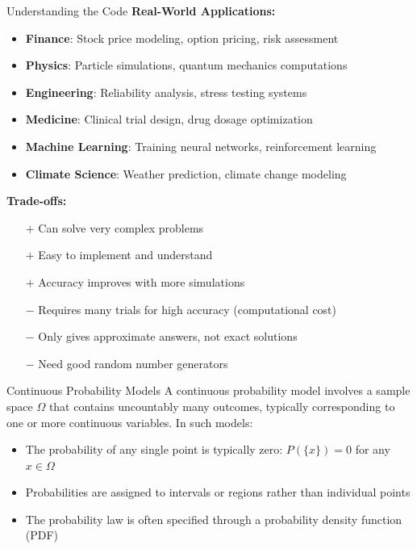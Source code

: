 \begin{itemize}
\begin{keyconceptboxbreak}{Understanding the Code}
\textbf{Real-World Applications:}

\begin{itemize}
    \item \textbf{Finance}: Stock price modeling, option pricing, risk assessment
    \item \textbf{Physics}: Particle simulations, quantum mechanics computations
    \item \textbf{Engineering}: Reliability analysis, stress testing systems
    \item \textbf{Medicine}: Clinical trial design, drug dosage optimization
    \item \textbf{Machine Learning}: Training neural networks, reinforcement learning
    \item \textbf{Climate Science}: Weather prediction, climate change modeling
\end{itemize}

\textbf{Trade-offs:}

\begin{itemize}
    \item[$+$] Can solve very complex problems
    \item[$+$] Easy to implement and understand
    \item[$+$] Accuracy improves with more simulations
    \item[$-$] Requires many trials for high accuracy (computational cost)
    \item[$-$] Only gives approximate answers, not exact solutions
    \item[$-$] Need good random number generators
\end{itemize}

\end{keyconceptboxbreak}

\begin{definitionboxbreak}{Continuous Probability Models}
A continuous probability model involves a sample space $\Omega$ that contains uncountably many outcomes, typically corresponding to one or more continuous variables. In such models:
\begin{itemize}
    \item The probability of any single point is typically zero: $P(\{x\}) = 0$ for any $x \in \Omega$
    \item Probabilities are assigned to intervals or regions rather than individual points
    \item The probability law is often specified through a probability density function (PDF)
\end{itemize}
\end{definitionboxbreak}


\end{itemize}
